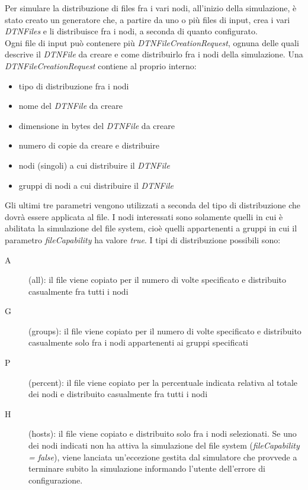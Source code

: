 Per simulare la distribuzione di files fra i vari nodi, all'inizio della simulazione, è stato creato un generatore che, a partire da uno o più files di input, crea i vari \textit{DTNFiles} e li distribuisce fra i nodi, a seconda di quanto configurato.
\\
Ogni file di input può contenere più \textit{DTNFileCreationRequest}, ognuna delle quali descrive il \textit{DTNFile} da creare e come distribuirlo fra i nodi della simulazione. Una \textit{DTNFileCreationRequest} contiene al proprio interno:
\begin{itemize}
\item tipo di distribuzione fra i nodi
\item nome del \textit{DTNFile} da creare
\item dimensione in bytes del \textit{DTNFile} da creare
\item numero di copie da creare e distribuire
\item nodi (singoli) a cui distribuire il \textit{DTNFile}
\item gruppi di nodi a cui distribuire il \textit{DTNFile}
\end{itemize}

Gli ultimi tre parametri vengono utilizzati a seconda del tipo di distribuzione che dovrà  essere applicata al file. I nodi interessati sono solamente quelli in cui è abilitata la simulazione del file system, cioè quelli appartenenti a gruppi in cui il parametro \textit{fileCapability} ha valore \textit{true}. I tipi di distribuzione possibili sono:
\begin{description}
\item[A] (all): il file viene copiato per il numero di volte specificato e distribuito casualmente fra tutti i nodi
\item[G] (groups): il file viene copiato per il numero di volte specificato e distribuito casualmente solo fra i nodi appartenenti ai gruppi specificati
\item[P] (percent): il file viene copiato per la percentuale indicata relativa al totale dei nodi e distribuito casualmente fra tutti i nodi
\item[H] (hosts): il file viene copiato e distribuito solo fra i nodi selezionati. Se uno dei nodi indicati non ha attiva la simulazione del file system (\textit{fileCapability = false}), viene lanciata un'eccezione gestita dal simulatore che provvede a terminare subito la simulazione informando l'utente dell'errore di configurazione.
\end{description}

